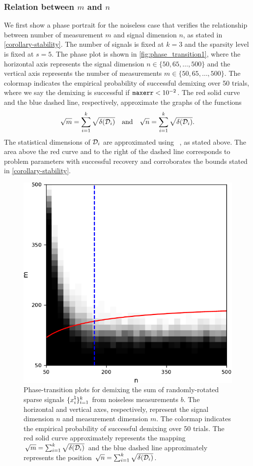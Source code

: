 \subsubsection{Relation between $m$ and $n$} \label{sec:phase_transition1}
We first show a phase portrait for the noiseless case that verifies the relationship between number of measurement $m$ and signal dimension $n$, as stated in \autoref{corollary-stability}. The number of signals is fixed at $k=3$ and the sparsity level is fixed at $s=5$. The phase plot is shown in \autoref{fig:phase_transition1}, where the horizontal axis represents the signal dimension $n\in\{50, 65, \dots, 500\}$ and the vertical axis represents the number of measurements $m\in\{50, 65, \dots, 500\}$. The colormap indicates the empirical probability of successful demixing over 50 trials, where we say the demixing is successful if $\mathop{\tt maxerr} < 10^{-2}$. The red solid curve and the blue dashed line, respectively, approximate the graphs of the functions
\[\sqrt{m} = \sum_{i=1}^k \sqrt{\delta(\mathcal{D}_i)}\hbox{\quad and\quad}\sqrt{n} = \sum_{i=1}^k \sqrt{\delta(\mathcal{D}_i)}.\]
The statistical dimensions of $\mathcal{D}_i$ are approximated using ~\cite[Proposition~4.5]{amelunxen2014living}, as stated above. The area above the red curve and to the right of the dashed line corresponds to problem parameters with successful recovery and corroborates the bounds stated in \autoref{corollary-stability}.

\begin{figure}[t]
    \centering
    \includegraphics[width=.5\linewidth]{./figures/relation_m_n.pdf}
    \caption{Phase-transition plots for demixing the sum of randomly-rotated sparse signals $\{x_i^{\natural}\}_{i=1}^k$ from noiseless measurements $b$. The horizontal and vertical axes, respectively, represent the signal dimension $n$ and measurement dimension $m$. The colormap indicates the empirical probability of successful demixing over 50 trials. The red solid curve approximately represents the mapping $\sqrt{m} = \sum_{i=1}^k \sqrt{\delta(\mathcal{D}_i)}$ and the blue dashed line approximately represents the position $\sqrt{n} = \sum_{i=1}^k \sqrt{\delta(\mathcal{D}_i)}$.}
    \label{fig:phase_transition1}
\end{figure}

